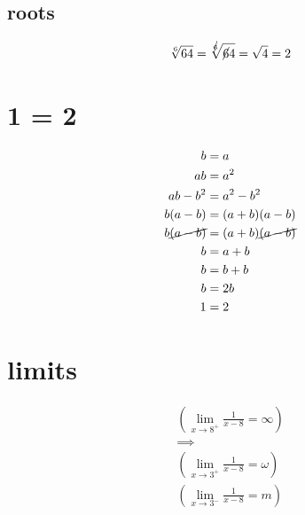 \documentclass{article}
\begin{document}
\subsection{roots}

\begin{equation}
	\begin{split}
	     \sqrt[6]{64} = \sqrt[\cancel{6}]{\cancel{6}4} = \sqrt{4} = 2
	\end{split}
\end{equation}

\section{1 = 2}

\begin{equation}
	\begin{split}
		b        &= a \\
		ab       &= a^2 \\
		ab - b^2 &= a^2 - b^2 \\
		b(a - b) &= (a + b)(a - b) \\
		b\cancel{(a - b)} &= (a + b)\cancel{(a - b)} \\
		b        &= a + b \\
		b        &= b + b \\
		b        &= 2b \\
		1        &= 2
	\end{split}
\end{equation}

\section{limits}

\begin{equation}
	\begin{split}
		(\lim_{x\to8^+}\frac{1}{x-8} = \infty) \\
		\implies \\
		(\lim_{x\to3^+}\frac{1}{x-8} = \omega) \\
		(\lim_{x\to3^-}\frac{1}{x-8} = m)
	\end{split}
\end{equation}
\end{document}
